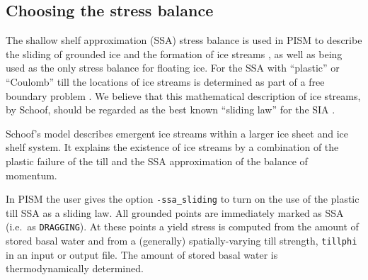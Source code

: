 \begin{comment}
\opt{shelfext\und} When computing ice shelf and stream velocity, PISM enforces boundary conditions using a fictitious extension of the ice shelf over the entire domain.  This extension provides strength only, it does not change the mass, driving force, or location of the calving front.  By default, it's strength will be computed using the current ice type at reference thickness, temperature, and strain rate, customizable using \texttt{-shelfext_H} (5 meters by default), \texttt{-shelfext_T} (263.15 K), \texttt{-shelfext_Du} (1 m/a per km).  The extension strength is used whenever ice thickness is less than the extension thickness to prevent the equations from becoming singular.  You can also specify the extension strength directly using \texttt{-shelfext_force_nuH} with units in Pa s.  Finally, you can compute strength using a \texttt{custom} ice type the ice used in the rest of PISM by giving \texttt{-shelfext_use_private_ice}.  This option will gives you a \texttt{custom} ice type which you can control via \texttt{-shelfext_ice_custom_} (see \texttt{-ice_type}).  All \texttt{-shelfext} options are displayed in \texttt{-help}.
\end{comment}

\subsection{Choosing the stress balance}  \label{subsect:ssacontrol}

The shallow shelf approximation (SSA) stress balance is used in PISM to describe the sliding of grounded ice and the formation of ice streams \cite{BBssasliding}, as well as being used as the only stress balance for floating ice.  For the SSA with ``plastic'' or ``Coulomb'' till the locations of ice streams is determined as part of a free boundary problem \cite{SchoofStream}.  We believe that this mathematical description of ice streams, by Schoof, should be regarded as the best known ``sliding law'' for the SIA \cite{BBssasliding}.

Schoof's model \cite{SchoofStream} describes emergent ice streams within a larger ice sheet and ice shelf system.  It explains the existence of ice streams by a combination of the plastic failure of the till and the SSA approximation of the balance of momentum.  

In PISM the user gives the option \texttt{-ssa_sliding} to turn on the use of the plastic till SSA as a sliding law.  All grounded points are immediately marked as SSA (i.e.~as \texttt{DRAGGING}).  At these points a yield stress is computed from the amount of stored basal water and from a (generally) spatially-varying till strength, \texttt{tillphi} in an input or output file.  The amount of stored basal water is thermodynamically determined.

